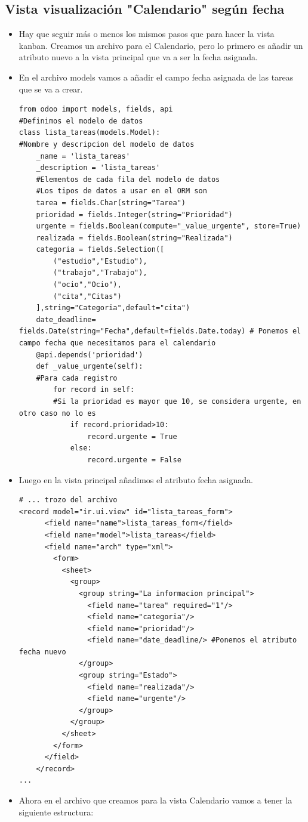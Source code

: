\documentclass[a4paper,12pt]{article}
\begin{document}
\subsection{Vista visualización "Calendario" según fecha}
    \begin{itemize}
        \item Hay que seguir más o menos los mismos pasos que para hacer la vista kanban. Creamos un archivo para el Calendario, pero lo primero es añadir un atributo nuevo a la vista principal que va a ser la fecha asignada.
        \item En el archivo models vamos a añadir el campo fecha asignada de las tareas que se va a crear.

\vspace{0.8cm}
\begin{lstlisting}[style=javascript]
from odoo import models, fields, api
#Definimos el modelo de datos
class lista_tareas(models.Model):
#Nombre y descripcion del modelo de datos
    _name = 'lista_tareas'
    _description = 'lista_tareas'
    #Elementos de cada fila del modelo de datos
    #Los tipos de datos a usar en el ORM son
    tarea = fields.Char(string="Tarea")
    prioridad = fields.Integer(string="Prioridad")
    urgente = fields.Boolean(compute="_value_urgente", store=True)
    realizada = fields.Boolean(string="Realizada")
    categoria = fields.Selection([
        ("estudio","Estudio"),
        ("trabajo","Trabajo"),
        ("ocio","Ocio"),
        ("cita","Citas")
    ],string="Categoria",default="cita")
    date_deadline= fields.Date(string="Fecha",default=fields.Date.today) # Ponemos el campo fecha que necesitamos para el calendario
    @api.depends('prioridad')
    def _value_urgente(self):
    #Para cada registro
        for record in self:
        #Si la prioridad es mayor que 10, se considera urgente, en otro caso no lo es
            if record.prioridad>10:
                record.urgente = True
            else:
                record.urgente = False
\end{lstlisting} 
    \item Luego en la vista principal añadimos el atributo fecha asignada.
\begin{lstlisting}[style=javascript]
# ... trozo del archivo
<record model="ir.ui.view" id="lista_tareas_form">
      <field name="name">lista_tareas_form</field>
      <field name="model">lista_tareas</field>
      <field name="arch" type="xml">
        <form>
          <sheet>
            <group>
              <group string="La informacion principal">
                <field name="tarea" required="1"/>
                <field name="categoria"/>
                <field name="prioridad"/>
                <field name="date_deadline/> #Ponemos el atributo fecha nuevo
              </group>
              <group string="Estado">
                <field name="realizada"/>
                <field name="urgente"/>
              </group>
            </group>
          </sheet>
        </form>
      </field>
    </record>
...
\end{lstlisting}     
        \item Ahora en el archivo que creamos para la vista Calendario vamos a tener la siguiente estructura:


\end{itemize}
\end{document}
